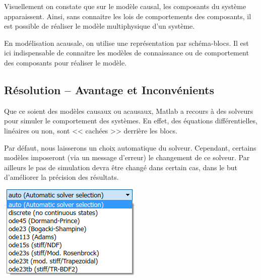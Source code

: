\documentclass[10pt,fleqn]{article} %
\begin{document}
Visuellement on constate que sur le modèle causal, les composants du système apparaissent. Ainsi, sans connaitre les lois de comportements des composants, il est possible de réaliser le modèle multiphysique d'un système.

En modélisation acausale, on utilise une représentation par schéma-blocs. Il est ici indispensable de connaitre les modèles de connaissance ou de comportement des composants pour réaliser le modèle.

\subsection{Résolution -- Avantage et Inconvénients}

\noindent
\begin{minipage}[c]{.6\linewidth}
Que ce soient des modèles causaux ou acausaux, Matlab a recours à des solveurs pour simuler le comportement des systèmes. En effet, des équations différentielles, linéaires ou non, sont << cachées >> derrière les blocs.  

Par défaut, nous laisserons un choix automatique du solveur. Cependant, certains modèles imposeront (via un message d'erreur) le changement de ce solveur. Par ailleurs le pas de simulation devra être changé dans certain cas, dans le but d'améliorer la précision des résultats.
\end{minipage} \hfill
\begin{minipage}[c]{.35\linewidth}
\begin{center}
\includegraphics[width=\linewidth]{images/solveur}
\end{center}
\end{minipage}
\end{document}
